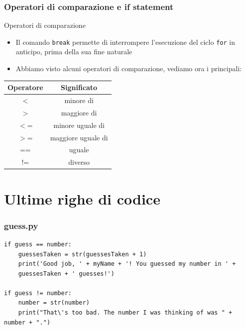 \documentclass{beamer}
\begin{document}
\begin{frame}[fragile]
\frametitle{Operatori di comparazione e if statement}
\begin{block}{Operatori di comparazione}
	\begin{itemize}
		\item Il comando \texttt{break} permette di interrompere l'esecuzione del ciclo \texttt{for} in anticipo, prima della sua fine naturale
		\item Abbiamo visto alcuni operatori di comparazione, vediamo ora i principali:
	\end{itemize}
\end{block}
\begin{center}
	\begin{tabular}{ c  c }
		\hline
		Operatore & Significato \\ 
		\hline
		$<$ & minore di \\  
		$>$ & maggiore di \\
		$<$= & minore uguale di \\  
		$>$= & maggiore uguale di \\
		== & uguale \\  
		$!$= & diverso 
	\end{tabular}
\end{center}
\end{frame}

\section{Ultime righe di codice}

\begin{frame}[fragile]
\frametitle{guess.py}
	\begin{lstlisting}
if guess == number:
    guessesTaken = str(guessesTaken + 1)
	print('Good job, ' + myName + '! You guessed my number in ' +
	guessesTaken + ' guesses!')
	
if guess != number:
	number = str(number)
	print("That\'s too bad. The number I was thinking of was " + number + ".")
	\end{lstlisting}
\end{frame}
\end{document}
